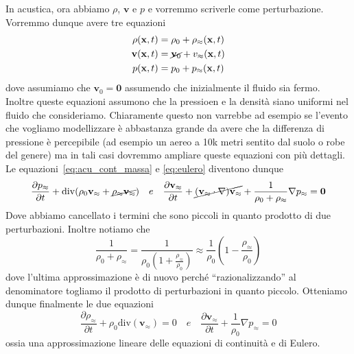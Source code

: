 In acustica, ora abbiamo \(\rho\), \(\mathbf{v} \) e \(p\) e vorremmo scriverle
come perturbazione. Vorremmo dunque avere tre equazioni
\begin{align*}
    \rho {(\mathbf{x} , t)} &= \rho_{0} + \rho_\approx {(\mathbf{x} , t)}\\ 
    \mathbf{v} {(\mathbf{x} , t)} &= \cancel{\mathbf{v}_0} + v_\approx {(\mathbf{x} , t)} \\
    p{(\mathbf{x} , t)} &= p_{0} + p_\approx {(\mathbf{x} , t)}
\end{align*}
dove assumiamo che \(\mathbf{v}_0 = \mathbf{0} \) assumendo che inizialmente il
fluido sia fermo. Inoltre queste equazioni assumono che la pressioen e la
densità siano uniformi nel fluido che consideriamo. Chiaramente questo non
varrebbe ad esempio se l'evento che vogliamo modellizzare è abbastanza grande da
avere che la differenza di pressione è percepibile (ad esempio un aereo a 10k
metri sentito dal suolo o robe del genere) ma in tali casi dovremmo ampliare
queste equazioni con più dettagli. Le equazioni~\eqref{eq:acu_cont_massa} e
\eqref{eq:eulero} diventono dunque
\[
  \frac{\partial p_\approx}{\partial t} + \mathrm{div}{(\rho_{0}
  \mathbf{v}_\approx + \cancel{\rho_\approx \mathbf{v}_\approx})} \quad e \quad 
  \frac{\partial \mathbf{v}_\approx}{\partial t} + \cancel{{(\mathbf{v}_\approx \cdot
  \nabla )} \mathbf{v}_\approx} + \frac{1}{\rho_{0} + \rho_{\approx} } \nabla
  p_{\approx} = \mathbf{0} 
\]
Dove abbiamo cancellato i termini che sono piccoli in quanto prodotto di due
perturbazioni. Inoltre notiamo che
\[
  \frac{1}{\rho_{0} + \rho_\approx} = \frac{1}{\rho_{0} {\left( 1 +
  \frac{\rho_\approx}{\rho_{0}} \right)} } \approx \frac{1}{\rho_{0}} {\left( 1
- \frac{\rho_\approx}{\rho_{0}}\right)} 
\]
dove l'ultima approssimazione è di nuovo perché ``razionalizzando'' al
denominatore togliamo il prodotto di perturbazioni in quanto piccolo. Otteniamo
dunque finalmente le due equazioni
\begin{equation}\label{eq:eulero_lineare}
  \frac{\partial \rho_\approx}{\partial t} + \rho_{0} \mathrm{div}{(\mathbf{v}
  _\approx)} = 0 \quad e \quad \frac{\partial \mathbf{v}_\approx}{\partial t} +
  \frac{1}{\rho_{0}} \nabla p_\approx = 0
\end{equation}
ossia una approssimazione lineare delle equazioni di continuità e di Eulero.

